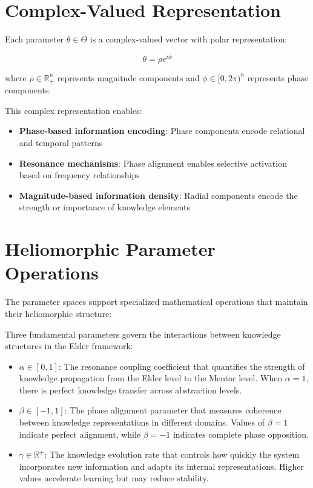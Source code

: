 \section{Complex-Valued Representation}

\begin{definition}
Each parameter $\theta \in \Theta$ is a complex-valued vector with polar representation:

\begin{equation}
\theta = \rho e^{i\phi}
\end{equation}

where $\rho \in \mathbb{R}^n_+$ represents magnitude components and $\phi \in [0, 2\pi)^n$ represents phase components.
\end{definition}

This complex representation enables:
\begin{itemize}
    \item \textbf{Phase-based information encoding}: Phase components encode relational and temporal patterns
    \item \textbf{Resonance mechanisms}: Phase alignment enables selective activation based on frequency relationships
    \item \textbf{Magnitude-based information density}: Radial components encode the strength or importance of knowledge elements
\end{itemize}

\section{Heliomorphic Parameter Operations}

The parameter spaces support specialized mathematical operations that maintain their heliomorphic structure:

\begin{definition}
Three fundamental parameters govern the interactions between knowledge structures in the Elder framework:

\begin{itemize}
    \item $\alpha \in [0,1]$: The resonance coupling coefficient that quantifies the strength of knowledge propagation from the Elder level to the Mentor level. When $\alpha = 1$, there is perfect knowledge transfer across abstraction levels.
    
    \item $\beta \in [-1,1]$: The phase alignment parameter that measures coherence between knowledge representations in different domains. Values of $\beta = 1$ indicate perfect alignment, while $\beta = -1$ indicates complete phase opposition.
    
    \item $\gamma \in \mathbb{R}^+$: The knowledge evolution rate that controls how quickly the system incorporates new information and adapts its internal representations. Higher values accelerate learning but may reduce stability.
\end{itemize}
\end{definition}


